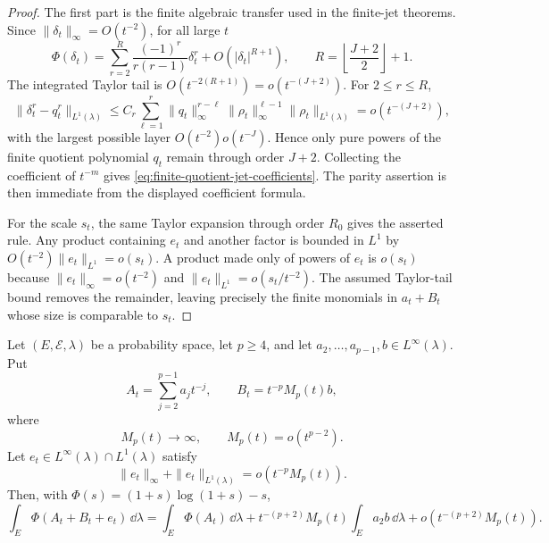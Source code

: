\ifdefined\JFAArticleMain
{}
\else
\begin{proof}
The first part is the finite algebraic transfer used in the finite-jet
theorems.  Since \(\|\delta_t\|_\infty=O(t^{-2})\), for all large \(t\)
\[
\Phi(\delta_t)=
\sum_{r=2}^{R}\frac{(-1)^r}{r(r-1)}\delta_t^r
+O(|\delta_t|^{R+1}),
\qquad
R=\left\lfloor\frac{J+2}{2}\right\rfloor+1 .
\]
The integrated Taylor tail is
\(O(t^{-2(R+1)})=o(t^{-(J+2)})\).  For \(2\le r\le R\),
\[
\|\delta_t^r-q_t^r\|_{L^1(\lambda)}
\le
C_r\sum_{\ell=1}^{r}
\|q_t\|_\infty^{r-\ell}
\|\rho_t\|_\infty^{\ell-1}
\|\rho_t\|_{L^1(\lambda)}
=o(t^{-(J+2)}),
\]
with the largest possible layer \(O(t^{-2})o(t^{-J})\).  Hence only pure
powers of the finite quotient polynomial \(q_t\) remain through order
\(J+2\).  Collecting the coefficient of \(t^{-m}\) gives
\eqref{eq:finite-quotient-jet-coefficients}.  The parity assertion is then
immediate from the displayed coefficient formula.

For the scale \(s_t\), the same Taylor expansion through order \(R_0\) gives
the asserted rule.
Any product containing \(e_t\) and another factor is bounded in \(L^1\) by
\(O(t^{-2})\|e_t\|_{L^1}=o(s_t)\).  A product made only of powers of \(e_t\)
is \(o(s_t)\) because \(\|e_t\|_\infty=o(t^{-2})\) and
\(\|e_t\|_{L^1}=o(s_t/t^{-2})\).  The assumed Taylor-tail bound removes the
remainder, leaving precisely the finite monomials in \(a_t+B_t\) whose size
is comparable to \(s_t\).
\end{proof}
\fi

\begin{lemma}%
\label{lem:moving-scale-taylor-transfer}
Let \((E,\mathcal E,\lambda)\) be a probability space, let \(p\ge4\), and let
\(a_2,\ldots,a_{p-1},b\in L^\infty(\lambda)\).  Put
\[
  A_t=\sum_{j=2}^{p-1}a_jt^{-j},\qquad
  B_t=t^{-p}M_p(t)b,
\]
where
\begin{equation}\label{eq:moving-scale-growth}
  M_p(t)\to\infty,\qquad M_p(t)=o(t^{p-2}).
\end{equation}
Let \(e_t\in L^\infty(\lambda)\cap L^1(\lambda)\) satisfy
\begin{equation}\label{eq:moving-scale-error}
  \|e_t\|_\infty+\|e_t\|_{L^1(\lambda)}
  =o(t^{-p}M_p(t)).
\end{equation}
Then, with \(\Phi(s)=(1+s)\log(1+s)-s\),
\begin{equation}\label{eq:moving-scale-transfer}
  \int_E\Phi(A_t+B_t+e_t)\,\dd\lambda
  =
  \int_E\Phi(A_t)\,\dd\lambda
  +t^{-(p+2)}M_p(t)\int_Ea_2b\,\dd\lambda
  +o(t^{-(p+2)}M_p(t)).
\end{equation}
\end{lemma}

